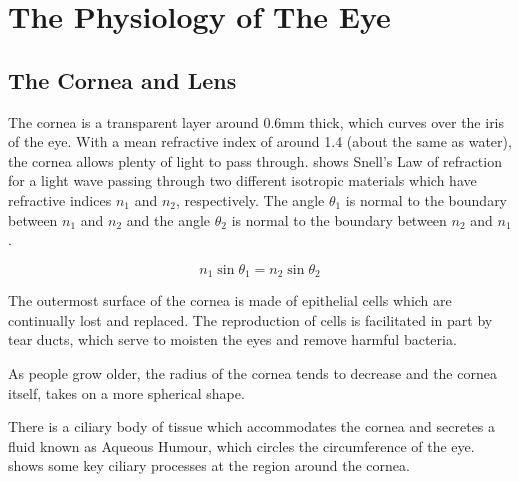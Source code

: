 
\chapter{The Physiology of The Eye}

\label{anatomy} %


\section{The Cornea and Lens}

The cornea is a transparent layer around 0.6mm thick, which curves over the
iris of the eye.\cite{yaylali1997corneal,thoft1983x,patel1994refractive}
With a mean refractive index of around 1.4 (about the same as water),
the cornea allows plenty of light to pass through. 
shows Snell's Law of refraction for a light wave passing through two
different isotropic materials which have refractive indices $n_1$ and $n_2$,
respectively. The angle $\theta_1$ is normal to the boundary between $n_1$
and $n_2$ and the angle $\theta_2$ is normal to the boundary between $n_2$
and $n_1$.

\begin{equation}
n_1\sin\theta_1=n_2\sin\theta_2
\label{eq:refractive}
\end{equation}


The outermost surface of the cornea is made of epithelial cells which
are continually lost and replaced.\cite{jester1999cellular,hassell2010molecular}
The reproduction of cells is facilitated in part
by tear ducts, which  serve to moisten the eyes
and remove harmful bacteria.\cite{holly1977tear}

As people grow older, the radius of the cornea tends
to decrease and the cornea itself, takes on a more spherical shape.\cite{guirao2000optical}

There is a ciliary body of tissue which accommodates the cornea and secretes a fluid known as Aqueous Humour, which circles the circumference of the eye.\cite{} shows some key ciliary processes at the region around the cornea.

